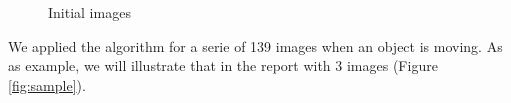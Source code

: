 \documentclass{article}
\begin{document}
\begin{figure}[H]
	  \centering
		  \hspace{0.1cm}
	  \caption{Initial images}
	  \label{fig:template}
\end{figure}

	We applied the algorithm for a serie of 139 images when an object is moving. As as example, we will illustrate that in the report with 3 images (Figure \ref{fig:sample}).
\end{document}
